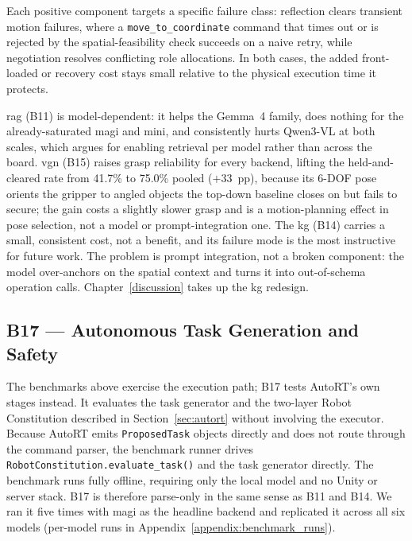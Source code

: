 \documentclass[
     12pt,
     a4paper,
     BCOR=10mm,
     DIV=14,
     listof=totoc,
     bibliography=totoc,
     parskip,
     twoside,
     headsepline
     ]{scrreprt}
\begin{document}
Each positive component targets a specific failure class: reflection clears transient motion failures, where a \texttt{move\_to\_coordinate} command that times out or is rejected by the spatial-feasibility check succeeds on a naive retry, while negotiation resolves conflicting role allocations. In both cases, the added front-loaded or recovery cost stays small relative to the physical execution time it protects.

\gls{rag} (B11) is model-dependent: it helps the Gemma~4 family, does nothing for the already-saturated \gls{magi} and \gls{mini}, and consistently hurts Qwen3-VL at both scales, which argues for enabling retrieval per model rather than across the board. \gls{vgn} (B15) raises grasp reliability for every backend, lifting the held-and-cleared rate from 41.7\% to 75.0\% pooled ($+33$~pp), because its 6-DOF pose orients the gripper to angled objects the top-down baseline closes on but fails to secure; the gain costs a slightly slower grasp and is a motion-planning effect in pose selection, not a model or prompt-integration one. The \gls{kg} (B14) carries a small, consistent cost, not a benefit, and its failure mode is the most instructive for future work. The problem is prompt integration, not a broken component: the model over-anchors on the spatial context and turns it into out-of-schema operation calls. Chapter~\ref{discussion} takes up the \gls{kg} redesign.

\subsection{B17 --- Autonomous Task Generation and Safety}\label{sec:results-autort}

The benchmarks above exercise the execution path; B17 tests AutoRT's own stages instead. It evaluates the task generator and the two-layer Robot Constitution described in Section~\ref{sec:autort} without involving the executor. Because AutoRT emits \texttt{ProposedTask} objects directly and does not route through the command parser, the benchmark runner drives \texttt{RobotConstitution.evaluate\_task()} and the task generator directly. The benchmark runs fully offline, requiring only the local model and no Unity or server stack. B17 is therefore parse-only in the same sense as B11 and B14. We ran it five times with \gls{magi} as the headline backend and replicated it across all six models (per-model runs in Appendix~\ref{appendix:benchmark_runs}).
\end{document}
